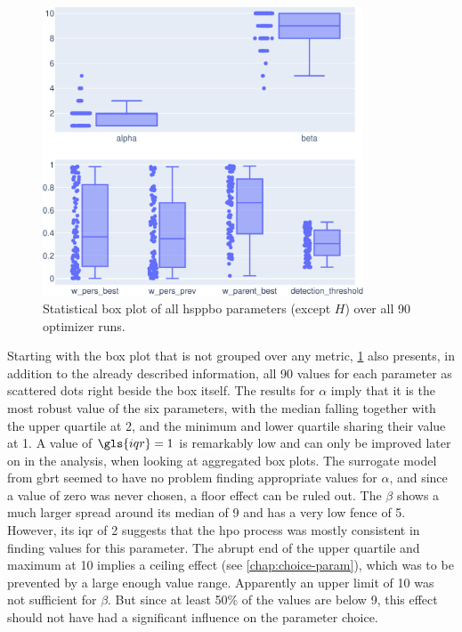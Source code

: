 \begin{figure}[h]
	\centering
	\includegraphics[width=0.85\textwidth]{results/part2/parameter_boxplot_None.svg}
	\caption[Statistical box plot of \gls{hsppbo} parameters]{Statistical box plot of all \gls{hsppbo} parameters (except $H$) over all 90 optimizer runs.}
	\label{fig:parameter_boxplot}
\end{figure}

Starting with the box plot that is not grouped over any metric, \cref{fig:parameter_boxplot} also presents, in addition to the already described information, all 90 values for each parameter as scattered dots right beside the box itself. The results for $\alpha$ imply that it is the most robust value of the six parameters, with the median falling together with the upper quartile at 2, and the minimum and lower quartile sharing their value at 1. A value of $\gls{iqr} = 1$ is remarkably low and can only be improved later on in the analysis, when looking at aggregated box plots. The surrogate model from \gls{gbrt} seemed to have no problem finding appropriate values for $\alpha$, and since a value of zero was never chosen, a floor effect can be ruled out. The $\beta$ shows a much larger spread around its median of 9 and has a very low fence of 5. However, its \gls{iqr} of 2 suggests that the \gls{hpo} process was mostly consistent in finding values for this parameter. The abrupt end of the upper quartile and maximum at 10 implies a ceiling effect (see \cref{chap:choice-param}), which was to be prevented by a large enough value range. Apparently an upper limit of 10 was not sufficient for $\beta$. But since at least 50\% of the values are below 9, this effect should not have had a significant influence on the parameter choice. 

